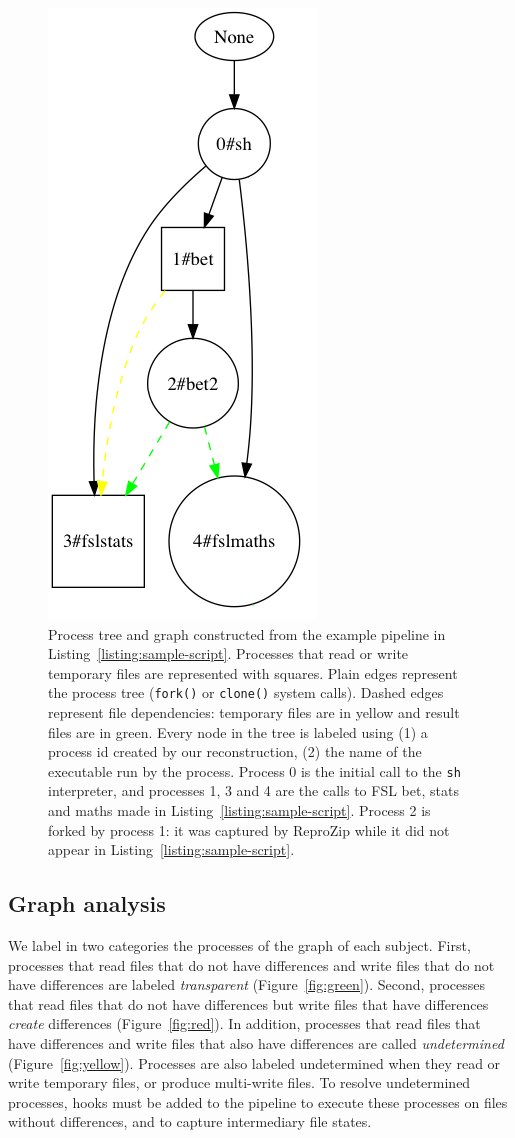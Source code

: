\documentclass[a4paper,num-refs]{oup-contemporary}
\newcommand{\reprozip}[0]{ReproZip\xspace}
\begin{document}
\begin{figure}
\centering
  \includegraphics[width=0.3\columnwidth]{images/simple_graph}
  \caption{Process tree and graph
  constructed from the example pipeline in
  Listing~\ref{listing:sample-script}.
  Processes that read or write
  temporary files are 
  represented with squares. Plain edges 
  represent the process tree (\texttt{fork()} or \texttt{clone()} 
  system calls). Dashed edges represent file dependencies: temporary 
  files are in yellow and result files are in green.
  Every node in the tree is labeled using (1) a process id created by our
  reconstruction, (2) the name of the executable run by the process.
  Process 0 is the initial call to the \texttt{sh} interpreter, and
  processes 1, 3 and 4 are the calls to FSL bet, stats and maths made in
  Listing~\ref{listing:sample-script}. Process 2 is forked by process 1: it
  was captured by \reprozip while it did not appear in
  Listing~\ref{listing:sample-script}. 
}
  \label{fig:simple_script}
\end{figure}


\subsection{Graph analysis}

We label in two categories the processes of the graph of each subject. First,
processes that read files that do not have differences and write files that
do not have differences are labeled \emph{transparent}
(Figure~\ref{fig:green}). Second, processes that read files that do not
have differences but write files that have differences \emph{create}
differences (Figure~\ref{fig:red}). In addition, processes that read files
that have differences and write files that also have differences are called
\emph{undetermined} (Figure~\ref{fig:yellow}). Processes are also labeled
undetermined when they read or write temporary files, or produce multi-write
files. To resolve undetermined processes, hooks must be added to the pipeline to 
execute these processes on files without differences, and to capture
intermediary file states.
\end{document}
